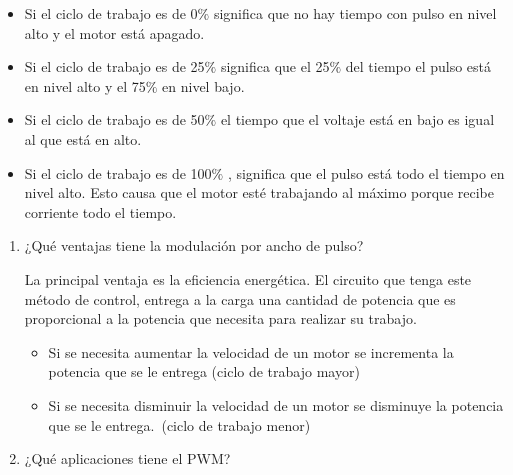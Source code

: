 \documentclass[12pt]{article}
\begin{document}
\begin{enumerate}

\par

\setlength{\parskip}{0.0pt}
\begin{itemize}
	\item Si el ciclo de trabajo es de 0$\%$  significa que no hay tiempo con pulso en nivel alto y el motor está apagado. \par

	\item Si el ciclo de trabajo es de 25$\%$  significa que el 25$\%$  del tiempo el pulso está en nivel alto y el 75$\%$  en nivel bajo. \par

	\item Si el ciclo de trabajo es de 50$\%$  el tiempo que el voltaje está en bajo es igual al que está en alto. \par

	\item Si el ciclo de trabajo es de 100$\%$ , significa que el pulso está todo el tiempo en nivel alto. Esto causa que el motor esté trabajando al máximo porque recibe corriente todo el tiempo. 
\end{itemize}\par

\begin{enumerate}
	\item \textcolor[HTML]{0066B3}{¿Qué ventajas tiene la modulación por ancho de pulso?}\par

La principal ventaja es la eficiencia energética. El circuito que tenga este método de control, entrega a la carga una cantidad de potencia que es proporcional a la potencia que necesita para realizar su trabajo.\par

\begin{itemize}
	\item Si se necesita aumentar la velocidad de un motor se incrementa la potencia que se le entrega (ciclo de trabajo mayor) \par

	\item Si se necesita disminuir la velocidad de un motor se disminuye la potencia que se le entrega. (ciclo de trabajo menor) 
\end{itemize}\par

	\item \textcolor[HTML]{0066B3}{¿Qué aplicaciones tiene el PWM?}\par


\end{enumerate}
\end{enumerate}
\end{document}
